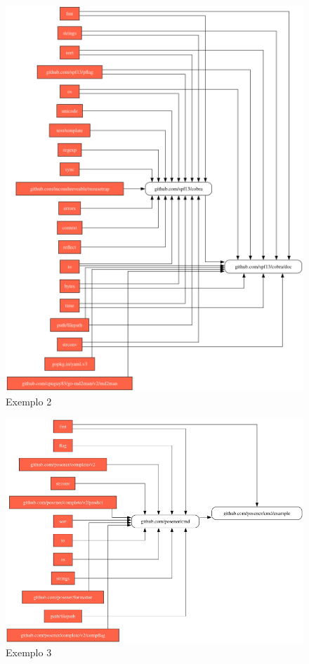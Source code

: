 \documentclass[12pt]{article}
\begin{document}
\begin{figure}[ht]
\centering
\includegraphics[width=1\textwidth]{examples/github.com_spf13_cobra.png}
\caption{Exemplo 2}
\label{fig:exemplo-2}
\end{figure}

\begin{figure}[ht]
\centering
\includegraphics[width=1\textwidth]{examples/github.com_posener_cmd.png}
\caption{Exemplo 3}
\label{fig:exemplo-3}
\end{figure}
\end{document}
